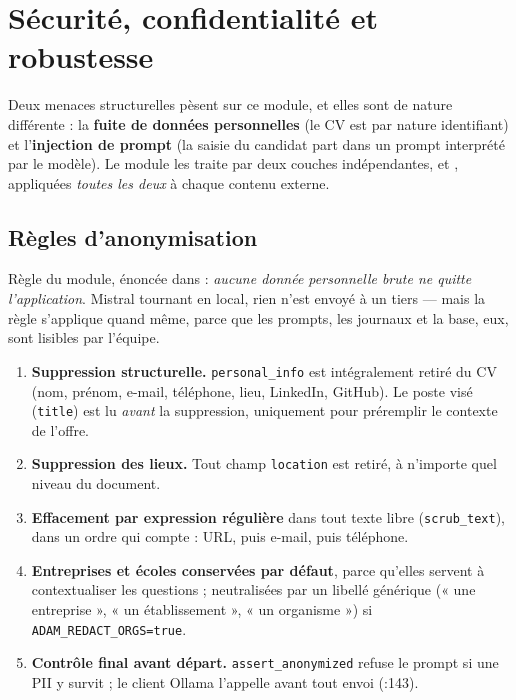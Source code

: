 \section{Sécurité, confidentialité et robustesse}
\label{sec:securite}

Deux menaces structurelles pèsent sur ce module, et elles sont de nature
différente : la \textbf{fuite de données personnelles} (le CV est par nature
identifiant) et l'\textbf{injection de prompt} (la saisie du candidat part dans
un prompt interprété par le modèle). Le module les traite par deux couches
indépendantes,  et , appliquées
\emph{toutes les deux} à chaque contenu externe.

\subsection{Règles d'anonymisation}
\label{sec:sec-pii}

Règle du module, énoncée dans  : \emph{aucune donnée
personnelle brute ne quitte l'application}. Mistral tournant en local, rien
n'est envoyé à un tiers --- mais la règle s'applique quand même, parce que les
prompts, les journaux et la base, eux, sont lisibles par l'équipe.

\begin{enumerate}[label=\textbf{R\arabic*.},leftmargin=3.2em,itemsep=3pt]
  \item \textbf{Suppression structurelle.} \texttt{personal\_info} est
        intégralement retiré du CV (nom, prénom, e-mail, téléphone, lieu,
        LinkedIn, GitHub). Le poste visé (\texttt{title}) est lu \emph{avant}
        la suppression, uniquement pour préremplir le contexte de l'offre.
  \item \textbf{Suppression des lieux.} Tout champ \texttt{location} est retiré,
        à n'importe quel niveau du document.
  \item \textbf{Effacement par expression régulière} dans tout texte libre
        (\texttt{scrub\_text}), dans un ordre qui compte : URL, puis e-mail,
        puis téléphone.
  \item \textbf{Entreprises et écoles conservées par défaut}, parce qu'elles
        servent à contextualiser les questions ; neutralisées par un libellé
        générique (« une entreprise », « un établissement », « un organisme »)
        si \texttt{ADAM\_REDACT\_ORGS=true}.
  \item \textbf{Contrôle final avant départ.} \texttt{assert\_anonymized} refuse
        le prompt si une PII y survit ; le client Ollama l'appelle avant tout
        envoi (:143).
\end{enumerate}

